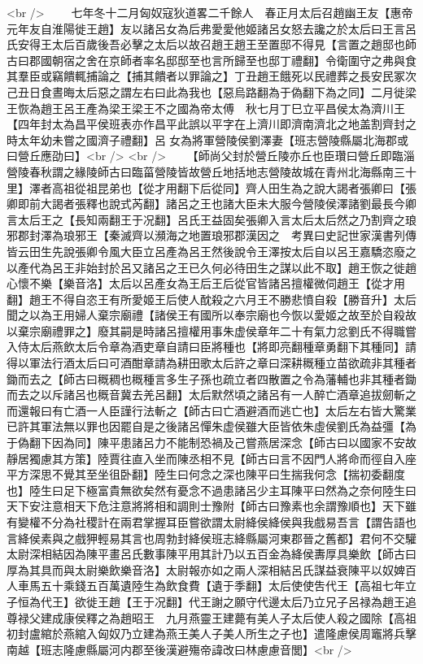 <br />
　　七年冬十二月匈奴寇狄道畧二千餘人　春正月太后召趙幽王友【惠帝元年友自淮陽徙王趙】友以諸呂女為后弗愛愛他姬諸呂女怒去讒之於太后曰王言呂氏安得王太后百歲後吾必擊之太后以故召趙王趙王至置邸不得見【言置之趙邸也師古曰郡國朝宿之舍在京師者率名邸邸至也言所歸至也邸丁禮翻】令衛圍守之弗與食其羣臣或竊饋輒捕論之【捕其饋者以罪論之】丁丑趙王餓死以民禮葬之長安民冢次　己丑日食晝晦太后惡之謂左右曰此為我也【惡烏路翻為于偽翻下為之同】二月徙梁王恢為趙王呂王產為梁王梁王不之國為帝太傅　秋七月丁巳立平昌侯太為濟川王【四年封太為昌平侯班表亦作昌平此誤以平字在上濟川即濟南濟北之地盖割齊封之時太年幼未嘗之國濟子禮翻】呂女為將軍營陵侯劉澤妻【班志營陵縣屬北海郡或曰營丘應劭曰】<br />
<br />
　　【師尚父封於營丘陵亦丘也臣瓚曰營丘即臨淄營陵春秋謂之緣陵師古曰臨菑營陵皆故營丘地括地志營陵故城在青州北海縣南三十里】澤者高祖從祖昆弟也【從才用翻下后從同】齊人田生為之說大謁者張卿曰【張卿即前大謁者張釋也說式芮翻】諸呂之王也諸大臣未大服今營陵侯澤諸劉最長今卿言太后王之【長知兩翻王于况翻】呂氏王益固矣張卿入言太后太后然之乃割齊之琅邪郡封澤為琅邪王【秦滅齊以瀕海之地置琅邪郡漢因之　考異曰史記世家漢書列傳皆云田生先說張卿令風大臣立呂產為呂王然後說令王澤按太后自以呂王嘉驕恣廢之以產代為呂王非始封於呂又諸呂之王已久何必待田生之謀以此不取】趙王恢之徙趙心懷不樂【樂音洛】太后以呂產女為王后王后從官皆諸呂擅權微伺趙王【從才用翻】趙王不得自恣王有所愛姬王后使人酖殺之六月王不勝悲憤自殺【勝音升】太后聞之以為王用婦人棄宗廟禮【諸侯王有國所以奉宗廟也今恢以愛姬之故至於自殺故以棄宗廟禮罪之】廢其嗣是時諸呂擅權用事朱虚侯章年二十有氣力忿劉氏不得職嘗入侍太后燕飲太后令章為酒吏章自請曰臣將種也【將即亮翻種章勇翻下其種同】請得以軍法行酒太后曰可酒酣章請為耕田歌太后許之章曰深耕穊種立苗欲疏非其種者鋤而去之【師古曰穊稠也穊種言多生子孫也疏立者四散置之令為藩輔也非其種者鋤而去之以斥諸呂也穊音冀去羌呂翻】太后默然頃之諸呂有一人醉亡酒章追拔劒斬之而還報曰有亡酒一人臣謹行法斬之【師古曰亡酒避酒而逃亡也】太后左右皆大驚業已許其軍法無以罪也因罷自是之後諸呂憚朱虚侯雖大臣皆依朱虛侯劉氏為益彊【為于偽翻下因為同】陳平患諸呂力不能制恐禍及己嘗燕居深念【師古曰以國家不安故靜居獨慮其方策】陸賈往直入坐而陳丞相不見【師古曰言不因門人將命而徑自入座平方深思不覺其至坐徂卧翻】陸生曰何念之深也陳平曰生揣我何念【揣初委翻度也】陸生曰足下極富貴無欲矣然有憂念不過患諸呂少主耳陳平曰然為之奈何陸生曰天下安注意相天下危注意將將相和調則士豫附【師古曰豫素也余謂豫順也】天下雖有變權不分為社稷計在兩君掌握耳臣嘗欲謂太尉絳侯絳侯與我戲易吾言【謂告語也言絳侯素與之戲狎輕易其言也周勃封絳侯班志絳縣屬河東郡晉之舊都】君何不交驩太尉深相結因為陳平畫呂氏數事陳平用其計乃以五百金為絳侯夀厚具樂飲【師古曰厚為其具而與太尉樂飲樂音洛】太尉報亦如之兩人深相結呂氏謀益衰陳平以奴婢百人車馬五十乘錢五百萬遺陸生為飲食費【遺于季翻】太后使使吿代王【高祖七年立子恒為代王】欲徙王趙【王于况翻】代王謝之願守代邊太后乃立兄子呂禄為趙王追尊禄父建成康侯釋之為趙昭王　九月燕靈王建薨有美人子太后使人殺之國除【高祖初封盧綰於燕綰入匈奴乃立建為燕王美人子美人所生之子也】遣隆慮侯周竈將兵擊南越【班志隆慮縣屬河内郡至後漢避殤帝諱改曰林慮慮音閭】<br />
